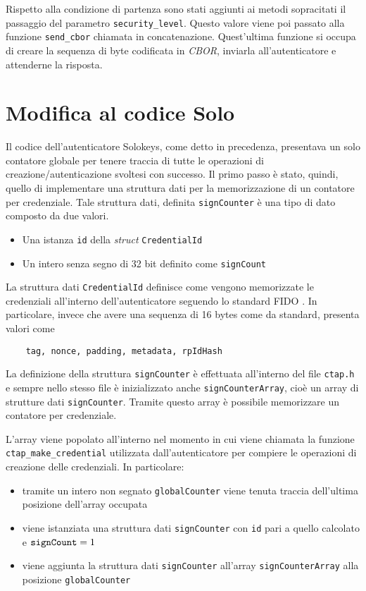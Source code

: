 Rispetto alla condizione di partenza sono stati aggiunti ai metodi sopracitati il passaggio del parametro \verb*|security_level|. Questo valore viene poi passato alla funzione \verb*|send_cbor| chiamata in concatenazione. Quest'ultima funzione si occupa di creare la sequenza di byte codificata in \emph{CBOR}, inviarla all'autenticatore e attenderne la risposta. 

\section{Modifica al codice Solo}
\label{modifica_solo}

Il codice dell'autenticatore Solokeys, come detto in precedenza, presentava un solo contatore globale per tenere traccia di tutte le operazioni di creazione/autenticazione svoltesi con successo. Il primo passo è stato, quindi, quello di implementare una struttura dati per la memorizzazione di un contatore per credenziale. Tale struttura dati, definita \verb*|signCounter| è una tipo di dato composto da due valori.
\begin{itemize}
	\item Una istanza \verb*|id| della \emph{struct} \verb*|CredentialId|
	\item Un intero senza segno di 32 bit definito come \verb*|signCount|
\end{itemize}

La struttura dati \verb*|CredentialId| definisce come vengono memorizzate le credenziali all'interno dell'autenticatore seguendo lo standard FIDO \cite{fido:credential_id}. In particolare, invece che avere una sequenza di 16 bytes come da standard, presenta valori come \begin{verbatim}
	tag, nonce, padding, metadata, rpIdHash
\end{verbatim} 

La definizione della struttura \verb*|signCounter| è effettuata all'interno del file \verb*|ctap.h| e sempre nello stesso file è inizializzato anche \verb*|signCounterArray|, cioè un array di strutture dati \verb*|signCounter|. Tramite questo array è possibile memorizzare un contatore per credenziale. 

L'array viene popolato all'interno nel momento in cui viene chiamata la funzione \verb*|ctap_make_credential| utilizzata dall'autenticatore per compiere le operazioni di creazione delle credenziali. In particolare:
\begin{itemize}
	\item tramite un intero non segnato \verb*|globalCounter| viene tenuta traccia dell'ultima posizione dell'array occupata
	\item viene istanziata una struttura dati \verb*|signCounter| con \verb*|id| pari a quello calcolato e $\verb*|signCount| = 1 $
	\item viene aggiunta la struttura dati \verb*|signCounter| all'array \verb*|signCounterArray| alla posizione \verb*|globalCounter|
\end{itemize}

